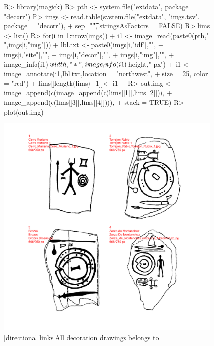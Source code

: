 \documentclass[article]{jss}
\begin{document}
\begin{figure}[H]
\begin{Schunk}
\begin{Sinput}
R> library(magick)
R> pth <- system.file("extdata", package = "decorr")
R> imgs <- read.table(system.file("extdata", "imgs.tsv", package = "decorr"),
+                        sep="\t", stringsAsFactors = FALSE)
R> lims <- list()
R> for(i in 1:nrow(imgs)){
+    i1 <- image_read(paste0(pth,"\\",imgs[i,"img"]))
+    lbl.txt <- paste0(imgs[i,"idf"],"\n",
+                      imgs[i,"site"],"\n",
+                      imgs[i,"decor"],"\n",
+                      imgs[i,"img"],"\n",
+                      image_info(i1)$width,"*",image_info(i1)$height," px")
+    i1 <- image_annotate(i1,lbl.txt,location = "northwest",
+                         size = 25, color = "red")
+    lims[[length(lims)+1]]<- i1
+  }
R> out.img <- image_append(c(image_append(c(lims[[1]],lims[[2]])),
+                            image_append(c(lims[[3]],lims[[4]]))),
+                          stack = TRUE)
R> plot(out.img)
\end{Sinput}
\end{Schunk}
\includegraphics{article_rvTH13-005}
[directional links]{All decoration drawings belongs to \citep{DiazGuardamino10}}
\end{figure}
\end{document}
